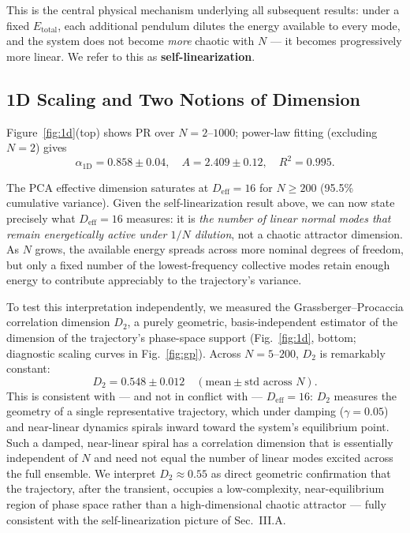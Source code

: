 \documentclass[aps,pre,12pt]{revtex4-2}
\begin{document}
This is the central physical mechanism underlying all subsequent results: under a fixed $E_{\text{total}}$, each additional pendulum dilutes the energy available to every mode, and the system does not become \emph{more} chaotic with $N$ --- it becomes progressively more linear. We refer to this as \textbf{self-linearization}.

\subsection{1D Scaling and Two Notions of Dimension}

Figure~\ref{fig:1d}(top) shows PR over $N=2$--$1000$; power-law fitting (excluding $N=2$) gives
\begin{equation}
    \alpha_{1\text{D}}=0.858\pm0.04,\quad A=2.409\pm0.12,\quad R^2=0.995.
\end{equation}

The PCA effective dimension saturates at $D_{\text{eff}}=16$ for $N\ge200$ (95.5\% cumulative variance). Given the self-linearization result above, we can now state precisely what $D_{\text{eff}}=16$ measures: it is \emph{the number of linear normal modes that remain energetically active under $1/N$ dilution}, not a chaotic attractor dimension. As $N$ grows, the available energy spreads across more nominal degrees of freedom, but only a fixed number of the lowest-frequency collective modes retain enough energy to contribute appreciably to the trajectory's variance.

To test this interpretation independently, we measured the Grassberger--Procaccia correlation dimension $D_2$, a purely geometric, basis-independent estimator of the dimension of the trajectory's phase-space support (Fig.~\ref{fig:1d}, bottom; diagnostic scaling curves in Fig.~\ref{fig:gp}). Across $N=5$--$200$, $D_2$ is remarkably constant:
\begin{equation}
    D_2 = 0.548 \pm 0.012 \quad (\text{mean} \pm \text{std across } N).
\end{equation}
This is consistent with --- and not in conflict with --- $D_{\text{eff}}=16$: $D_2$ measures the geometry of a single representative trajectory, which under damping ($\gamma=0.05$) and near-linear dynamics spirals inward toward the system's equilibrium point. Such a damped, near-linear spiral has a correlation dimension that is essentially independent of $N$ and need not equal the number of linear modes excited across the full ensemble. We interpret $D_2\approx0.55$ as direct geometric confirmation that the trajectory, after the transient, occupies a low-complexity, near-equilibrium region of phase space rather than a high-dimensional chaotic attractor --- fully consistent with the self-linearization picture of Sec.~III.A.
\end{document}
